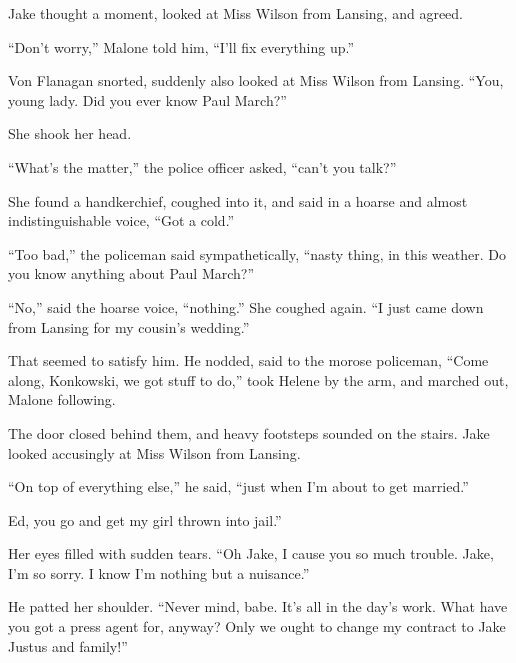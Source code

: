 \documentclass{novel}
\begin{document}
Jake thought a moment, looked at Miss Wilson from Lansing, and agreed.

“Don’t worry,” Malone told him, “I’ll fix everything up.”

Von Flanagan snorted, suddenly also looked at Miss Wilson from Lansing. “You, young lady. Did you ever know Paul March?”

She shook her head.

“What’s the matter,” the police officer asked, “can’t you talk?”

She found a handkerchief, coughed into it, and said in a hoarse and almost indistinguishable voice, “Got a cold.”

“Too bad,” the policeman said sympathetically, “nasty thing, in this weather. Do you know anything about Paul March?”

“No,” said the hoarse voice, “nothing.” She coughed again. “I just came down from Lansing for my cousin’s wedding.”

That seemed to satisfy him. He nodded, said to the morose policeman, “Come along, Konkowski, we got stuff to do,” took Helene by the arm, and marched out, Malone following.

The door closed behind them, and heavy footsteps sounded on the stairs. Jake looked accusingly at Miss Wilson from Lansing.

“On top of everything else,” he said, “just when I’m about to get married.”

Ed, you go and get my girl thrown into jail.”

Her eyes filled with sudden tears. “Oh Jake, I cause you so much trouble. Jake, I’m so sorry. I know I'm nothing but a nuisance.”

He patted her shoulder. “Never mind, babe. It’s all in the day’s work. What have you got a press agent for, anyway? Only we ought to change my contract to Jake Justus and family!”

\vspace{2\nbs}
\clearpage
\thispagestyle{empty}

\begin{ChapterStart}
\vspace{3\nbs}
\end{ChapterStart}
\end{document}
